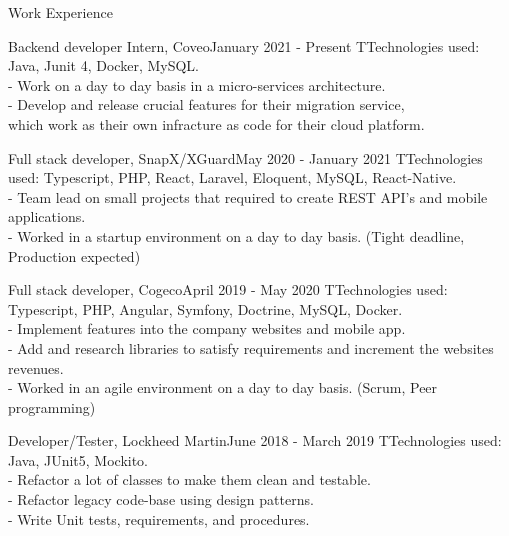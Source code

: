 \documentclass[10pt]{resume} %
\begin{document}
\begin{rSection}{Work Experience}

\begin{rSubsection}{Backend developer Intern, Coveo}{January 2021 - Present}{}
TTechnologies used: Java, Junit 4, Docker, MySQL.\\
- Work on a day to day basis in a micro-services architecture.\\
- Develop and release crucial features for their migration service, \\
which work as their own infracture as code for their cloud platform.
\end{rSubsection}

\begin{rSubsection}{Full stack developer, SnapX/XGuard}{May 2020 - January 2021}{}
TTechnologies used: Typescript, PHP, React, Laravel, Eloquent, MySQL, React-Native.\\
- Team lead on small projects that required to create REST API's and mobile applications.\\
- Worked in a startup environment on a day to day basis. (Tight deadline, Production expected)
\end{rSubsection}

\begin{rSubsection}{Full stack developer, Cogeco}{April 2019 - May 2020}{}
TTechnologies used: Typescript, PHP, Angular, Symfony, Doctrine, MySQL, Docker.\\
- Implement features into the company websites and mobile app.\\
- Add and research libraries to satisfy requirements and increment the websites revenues.\\
- Worked in an agile environment on a day to day basis. (Scrum, Peer programming)
\end{rSubsection}

\begin{rSubsection}{Developer/Tester, Lockheed Martin}{June 2018 - March 2019}{}   TTechnologies used: Java, JUnit5, Mockito.\\
- Refactor a lot of classes to make them clean and testable.\\
- Refactor legacy code-base using design patterns.\\
- Write Unit tests, requirements, and procedures.
\end{rSubsection}

\end{rSection}
\end{document}
